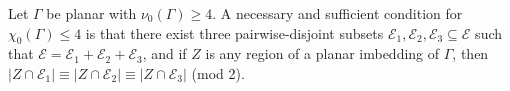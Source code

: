 Let $\Gamma$ be planar with $\nu_0(\Gamma) \geq 4$. A necessary and sufficient condition for $\chi_0(\Gamma) \leq 4$ is that there exist three pairwise-disjoint subsets $\mathcal{E}_1, \mathcal{E}_2, \mathcal{E}_3 \subseteq \mathcal{E}$ such that $\mathcal{E} = \mathcal{E}_1 + \mathcal{E}_2 + \mathcal{E}_3$, and if $Z$ is any region of a planar imbedding of $\Gamma$, then $|Z \cap \mathcal{E}_1| \equiv |Z \cap \mathcal{E}_2| \equiv |Z \cap \mathcal{E}_3|$ (mod 2).
